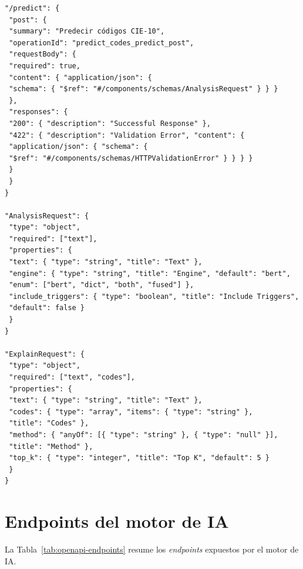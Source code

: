 {\small
\begin{verbatim}
"/predict": {
 "post": {
 "summary": "Predecir códigos CIE-10",
 "operationId": "predict_codes_predict_post",
 "requestBody": {
 "required": true,
 "content": { "application/json": {
 "schema": { "$ref": "#/components/schemas/AnalysisRequest" } } }
 },
 "responses": {
 "200": { "description": "Successful Response" },
 "422": { "description": "Validation Error", "content": {
 "application/json": { "schema": {
 "$ref": "#/components/schemas/HTTPValidationError" } } } }
 }
 }
}

"AnalysisRequest": {
 "type": "object",
 "required": ["text"],
 "properties": {
 "text": { "type": "string", "title": "Text" },
 "engine": { "type": "string", "title": "Engine", "default": "bert",
 "enum": ["bert", "dict", "both", "fused"] },
 "include_triggers": { "type": "boolean", "title": "Include Triggers",
 "default": false }
 }
}

"ExplainRequest": {
 "type": "object",
 "required": ["text", "codes"],
 "properties": {
 "text": { "type": "string", "title": "Text" },
 "codes": { "type": "array", "items": { "type": "string" },
 "title": "Codes" },
 "method": { "anyOf": [{ "type": "string" }, { "type": "null" }],
 "title": "Method" },
 "top_k": { "type": "integer", "title": "Top K", "default": 5 }
 }
}
\end{verbatim}
}

\section{Endpoints del motor de IA}

La Tabla~\ref{tab:openapi-endpoints} resume los \emph{endpoints} expuestos por el motor de IA.

